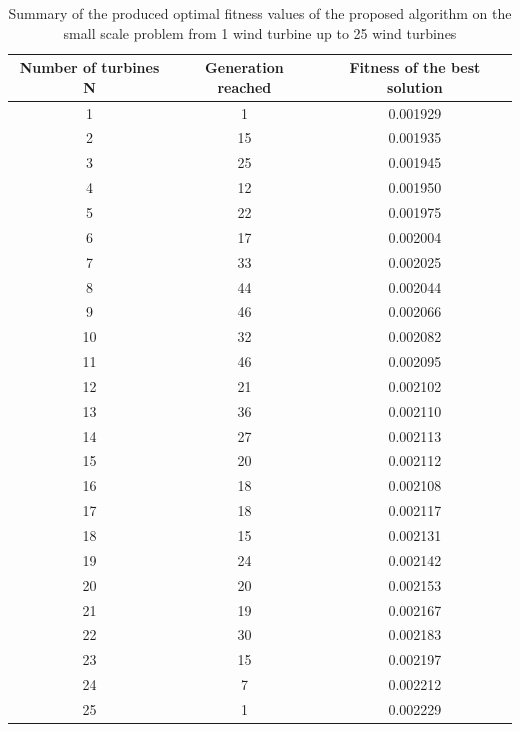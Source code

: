     \begin{table}[h]
        \centering
        \begin{tabular}{|c|c|c|} \hline
            \textbf{Number of turbines N} & \textbf{Generation reached} &\textbf{Fitness of the best solution} \\ \hline
            1 & 1 & 0.001929 \\ \hline
            2 & 15 & 0.001935 \\ \hline
            3 & 25 & 0.001945 \\ \hline
            4 & 12 & 0.001950 \\ \hline
            5 & 22 & 0.001975 \\ \hline
            6 & 17 & 0.002004 \\ \hline
            7 & 33 & 0.002025 \\ \hline
            8 & 44 & 0.002044 \\ \hline
            9 & 46 & 0.002066 \\ \hline
            10 & 32 & 0.002082 \\ \hline
            11 & 46 & 0.002095 \\ \hline
            12 & 21 & 0.002102 \\ \hline
            13 & 36 & 0.002110 \\ \hline
            14 & 27 & 0.002113 \\ \hline
            15 & 20 & 0.002112 \\ \hline
            16 & 18 & 0.002108 \\ \hline
            17 & 18 & 0.002117 \\ \hline
            18 & 15 & 0.002131 \\ \hline
            19 & 24 & 0.002142 \\ \hline
            20 & 20 & 0.002153 \\ \hline
            21 & 19 & 0.002167 \\ \hline
            22 & 30 & 0.002183 \\ \hline
            23 & 15 & 0.002197 \\ \hline
            24 & 7 & 0.002212 \\ \hline
            25 & 1 & 0.002229 \\ \hline
        \end{tabular}
        \caption{Summary of the produced optimal fitness values of the proposed algorithm on the small scale problem from 1 wind turbine up to 25 wind turbines}
        \label{resultsSmall}
    \end{table}
    

